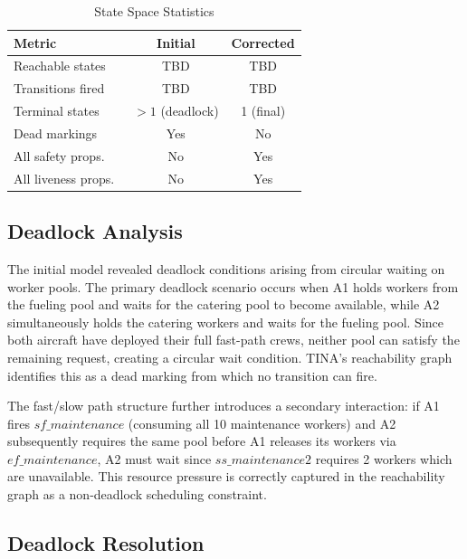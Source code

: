 \documentclass[conference]{IEEEtran}
\begin{document}
\begin{table}[htbp]
  \caption{State Space Statistics}
  \label{tab:statespace}
  \small
  \begin{tabularx}{\columnwidth}{@{}Xcc@{}}
    \toprule
    \textbf{Metric} & \textbf{Initial} & \textbf{Corrected} \\
    \midrule
    Reachable states     & TBD            & TBD           \\
    Transitions fired    & TBD            & TBD           \\
    Terminal states      & $>1$ (deadlock) & 1 (final)    \\
    Dead markings        & Yes            & No            \\
    All safety props.\   & No             & Yes           \\
    All liveness props.\ & No             & Yes           \\
    \bottomrule
  \end{tabularx}
\end{table}

\subsection{Deadlock Analysis}

The initial model revealed deadlock conditions arising from circular waiting on
worker pools. The primary deadlock scenario occurs when A1 holds workers from the
fueling pool and waits for the catering pool to become available, while A2
simultaneously holds the catering workers and waits for the fueling pool. Since
both aircraft have deployed their full fast-path crews, neither pool can satisfy
the remaining request, creating a circular wait condition. TINA's reachability
graph identifies this as a dead marking from which no transition can fire.

The fast/slow path structure further introduces a secondary interaction: if A1
fires $\mathit{sf\_maintenance}$ (consuming all 10 maintenance workers) and A2
subsequently requires the same pool before A1 releases its workers via
$\mathit{ef\_maintenance}$, A2 must wait since $\mathit{ss\_maintenance2}$
requires 2 workers which are unavailable. This resource pressure is correctly
captured in the reachability graph as a non-deadlock scheduling constraint.

\subsection{Deadlock Resolution}
\end{document}
